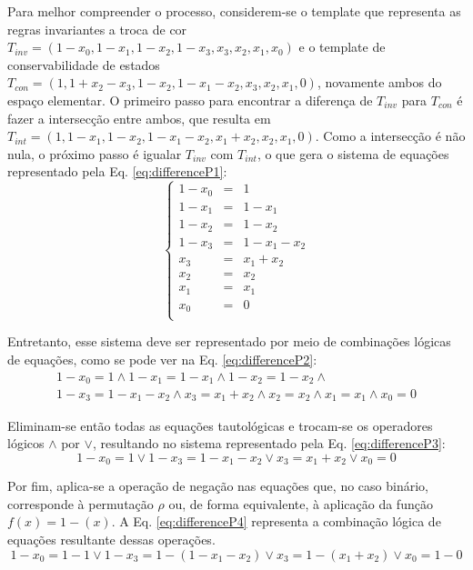 \documentclass[12pt, a4paper]{article}
\begin{document}
Para melhor compreender o processo, considerem-se o template que representa as regras invariantes a troca de cor $T_{inv} = (1 - x_0, 1 - x_1, 1 - x_2, 1 - x_3, x_3, x_2, x_1, x_0)$ e o template de conservabilidade de estados $T_{con} = (1, 1 + x_2 - x_3, 1 - x_2, 1 - x_1 - x_2, x_3, x_2, x_1, 0)$, novamente ambos do espaço elementar. O primeiro passo para encontrar a diferença de $T_{inv}$ para $T_{con}$ é fazer a intersecção entre ambos, que resulta em $T_{int} = (1, 1 - x_1, 1 - x_2, 1 - x_1 - x_2, x_1 + x_2, x_2, x_1, 0)$. Como a intersecção é não nula, o próximo passo é igualar $T_{inv}$ com $T_{int}$, o que gera o sistema de equações representado pela Eq. \ref{eq:differenceP1}: \begin{equation} \left\{\begin{matrix} 1 - x_0	& = &	1				\\ 1 - x_1	& = &	1 - x_1			\\ 1 - x_2	& = &	1 - x_2			\\ 1 - x_3	& = &	1 - x_1 - x_2	\\
x_3		& = &	x_1 + x_2		\\
x_2		& = &	x_2				\\
x_1		& = &	x_1				\\
x_0		& = &	0				\\
\end{matrix}\right.
\label{eq:differenceP1}
\end{equation}

Entretanto, esse sistema deve ser representado por meio de combinações lógicas de equações, como se pode ver na Eq. \ref{eq:differenceP2}:
\begin{equation}
\begin{split}
1 - x_0	= 1				\wedge
1 - x_1	= 1 - x_1		\wedge
1 - x_2	= 1 - x_2		\wedge\\
1 - x_3	= 1 - x_1 - x_2	\wedge 
x_3		= x_1 + x_2		\wedge
x_2		= x_2			\wedge
x_1		= x_1			\wedge
x_0		= 0				
\label{eq:differenceP2}
\end{split}
\end{equation}

Eliminam-se então todas as equações tautológicas e trocam-se os operadores lógicos $\wedge$ por $\vee$, resultando no sistema representado pela Eq. \ref{eq:differenceP3}:
\begin{equation}
1 - x_0	= 1				\vee 
1 - x_3	= 1 - x_1 - x_2	\vee
x_3		= x_1 + x_2		\vee 
x_0		= 0				
\label{eq:differenceP3}
\end{equation}

Por fim, aplica-se a operação de negação nas equações que, no caso binário, corresponde à permutação $\rho $ ou,  de forma equivalente, à aplicação da função $f(x) = 1 - (x)$. A Eq. \eqref{eq:differenceP4} representa a combinação lógica de equações resultante dessas operações.
\begin{equation}
1 - x_0	= 1 - 1					\vee 
1 - x_3	= 1 - (1 - x_1 - x_2)	\vee
x_3		= 1 - (x_1 + x_2)		\vee 
x_0		= 1 - 0				
\label{eq:differenceP4}
\end{equation}
\end{document}
